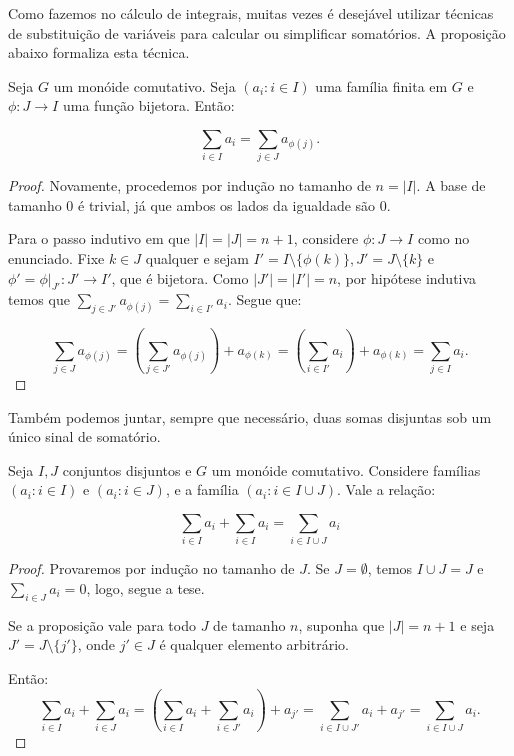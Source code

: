 Como fazemos no cálculo de integrais, muitas vezes é desejável utilizar técnicas de substituição de variáveis para calcular ou simplificar somatórios.
A proposição abaixo formaliza esta técnica.
\begin{prop}\label{prop:group_sumVarChange}   
    Seja $G$ um monóide comutativo.
    Seja $(a_i: i \in I)$ uma família finita em $G$ e $\phi:J\rightarrow I$ uma função bijetora.
    Então:

    \[\sum_{i \in I}a_i=\sum_{j \in J}a_{\phi(j)}.\]

\end{prop}
\begin{proof}
Novamente, procedemos por indução no tamanho de $n=|I|$.
A base de tamanho $0$ é trivial, já que ambos os lados da igualdade são $0$.

Para o passo indutivo em que $|I|=|J|=n+1$, considere $\phi:J\rightarrow I$ como no enunciado.
Fixe $k \in J$ qualquer e sejam $I'=I\setminus\{\phi(k)\}, J'=J\setminus\{k\}$ e $\phi'=\phi|_{J'}:J'\rightarrow I'$, que é bijetora.
Como $|J'|=|I'|=n$, por hipótese indutiva temos que $\sum_{j \in J'}a_{\phi(j)}=\sum_{i \in I'}a_i$.
Segue que:

\[\sum_{j \in J}a_{\phi(j)}=\left(\sum_{j \in J'}a_{\phi(j)}\right)+a_{\phi(k)}=\left(\sum_{i \in I'}a_{i}\right)+a_{\phi(k)}=\sum_{j \in I}a_{i}.\]
\end{proof}

Também podemos juntar, sempre que necessário, duas somas disjuntas sob um único sinal de somatório.
\begin{prop}\label{prop:group_sumConcat}
    Seja $I, J$ conjuntos disjuntos e $G$ um monóide comutativo. Considere famílias $(a_i: i \in I)$ e $(a_i: i \in J)$, e a família $(a_i: i \in I\cup J)$.
    Vale a relação:

    \[\sum_{i \in I}a_i+\sum_{i \in I}a_i=\sum_{i \in I\cup J}a_i\]
\end{prop}
\begin{proof}
    Provaremos por indução no tamanho de $J$.
    Se $J=\emptyset$, temos $I\cup J=J$ e $\sum_{i \in J}a_i=0$, logo, segue a tese.

    Se a proposição vale para todo $J$ de tamanho $n$, suponha que $|J|=n+1$ e seja $J'=J\setminus \{j'\}$, onde $j' \in J$ é qualquer elemento arbitrário.

    Então:
    \[\sum_{i \in I}a_i+\sum_{i \in J}a_i=\left(\sum_{i \in I}a_i+\sum_{i \in J'}a_i\right)+a_{j'}=\sum_{i \in I\cup J'}a_i+a_{j'}=\sum_{i \in I\cup J}a_i.\]
\end{proof}

